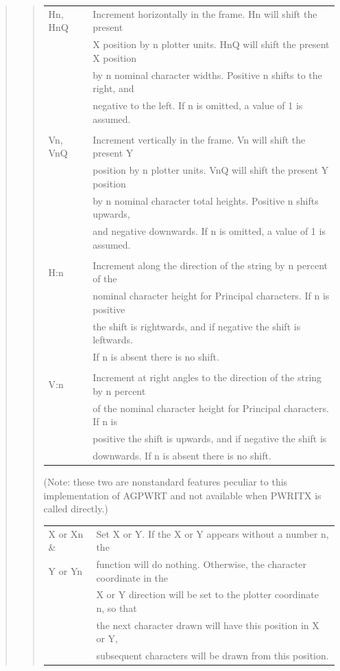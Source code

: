 \documentclass[twoside,11pt]{article}
\renewcommand{\_}{\texttt{\symbol{95}}}
\begin{document}
\begin{quote}
\begin{quote}
\begin{tabular}{ll}
Hn, HnQ & Increment horizontally in the frame.  Hn will shift the present\\
 & X position by n plotter units. HnQ will shift the present X position\\
 & by n nominal character widths.  Positive n shifts to the right, and\\
 & negative to the left.  If n is omitted, a value of 1 is assumed.\\
\\
Vn, VnQ & Increment vertically in the frame.  Vn will shift the present Y\\
 & position by n plotter units.  VnQ will shift the present Y position\\
 & by n nominal character total heights.  Positive n shifts upwards,\\
 & and negative downwards.  If n is omitted, a value of 1 is assumed.\\
\\
H:n & Increment along the direction of the string by n percent of the\\
 & nominal character height for Principal characters.  If n is positive\\
 & the shift is rightwards, and if negative the shift is leftwards.\\
 & If n is absent there is no shift.\\
\\
V:n & Increment at right angles to the direction of the string by n percent\\
 & of the nominal character height for Principal characters.  If n is\\
 & positive the shift is upwards, and if negative the shift is\\
 & downwards.  If n is absent there is no shift.
\end{tabular}

(Note: these two are nonstandard features peculiar to this
implementation of AGPWRT and not available when PWRITX is
called directly.)

\begin{tabular}{ll}
X or Xn \& & Set X or Y.  If the X or Y appears without a number n, the\\
Y or Yn & function will do nothing.  Otherwise, the character coordinate in the\\
 & X or Y direction will be set to the plotter coordinate n, so that\\
 & the next character drawn will have this position in X or Y,\\
 & subsequent characters will be drawn from this position.
\end{tabular}


\end{quote}
\end{quote}
\end{document}
